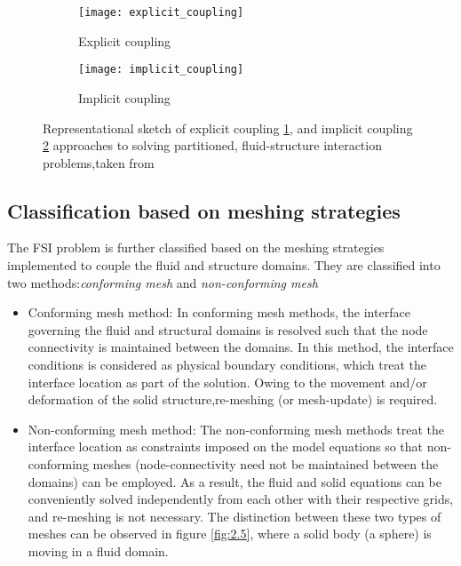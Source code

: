\begin{figure}[h]
  \centering
  \begin{subfigure}[b]{0.4\linewidth}
    \texttt{[image: explicit\_coupling]}
    \caption{Explicit coupling}
    \label{fig:2.4a}  
  \end{subfigure}
  \begin{subfigure}[b]{0.4\linewidth}
    \texttt{[image: implicit\_coupling]}
    \caption{Implicit coupling}
    \label{fig:2.4b} 
  \end{subfigure}
  \caption{Representational sketch of explicit coupling \ref{fig:2.4a}, and implicit coupling \ref{fig:2.4b} approaches to solving partitioned, fluid-structure interaction problems,taken from \citet{munsch2015entwicklung}}
  \label{fig:2.4}
\end{figure}

\subsection{Classification based on meshing strategies}\par
The FSI problem is further classified based on the meshing strategies implemented to couple the fluid and structure domains. They are classified into two methods:\textit{conforming mesh} and \textit{non-conforming mesh}\\

\begin{itemize}
 \item Conforming mesh method: In conforming mesh methods, the interface governing the fluid and structural domains is resolved such that the node connectivity is maintained between the domains. In this method, the interface conditions is considered as physical boundary conditions, which treat the interface location as part of the solution. Owing to the movement and/or deformation of the solid structure,re-meshing (or mesh-update) is required.
 
 \item Non-conforming mesh method: The non-conforming mesh methods treat the interface location as constraints imposed on the model equations so that non-conforming meshes (node-connectivity need not be maintained between the domains) can be employed. As a result, the fluid and solid equations can be conveniently solved independently from each other with their respective grids, and re-meshing is not necessary. The distinction between these two types of meshes can be observed in figure \ref{fig:2.5}, where a solid body (a sphere) is moving in a fluid domain.  
 \end{itemize} 
 
